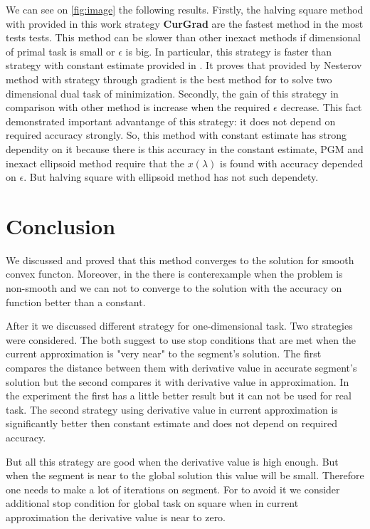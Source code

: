 \documentclass[12pt]{article}
\begin{document}
We can see on \ref{fig:image} the following results. Firstly, the halving square method with provided in this work strategy \textbf{CurGrad} are the fastest method in the most tests tests. This method can be slower than other inexact methods if dimensional of primal task is small or $\epsilon$ is big. In particular, this strategy is faster than strategy with constant estimate provided in \cite{Ston_Pas}. It proves that provided by Nesterov method with strategy through gradient is the best method for to solve two dimensional dual task of minimization. Secondly, the gain of this strategy in comparison with other method is increase when the required $\epsilon$ decrease. This fact demonstrated important advantange of this strategy: it does not depend on required accuracy strongly. So, this method with constant estimate has strong dependity on it because there is this accuracy in the constant estimate, PGM and inexact ellipsoid method require that the $x(\lambda)$ is found with accuracy depended on $\epsilon$. But halving square with ellipsoid method has not such dependety.
\section{Conclusion}

We discussed and proved that this method converges to the solution for smooth convex functon. Moreover, in the \cite{Ston_Pas} there is conterexample when the problem is non-smooth and we can not to converge to the solution with the accuracy on function better than a constant.

After it we discussed different strategy for one-dimensional task. Two strategies were considered. The both suggest to use stop conditions that are met when the current approximation is "very near" to the segment's solution. The first compares the distance between them with derivative value in accurate segment's solution but the second compares it with derivative value in approximation. In the experiment the first has a little better result but it can not be used for real task. The second strategy using derivative value in current approximation is significantly better then constant estimate and does not depend on required accuracy.

But all this strategy are good when the derivative value is high enough. But when the segment is near to the global solution this value will be small. Therefore one needs to make a lot of iterations on segment. For to avoid it we consider additional stop condition for global task on square when in current approximation the derivative value is near to zero.
\end{document}
